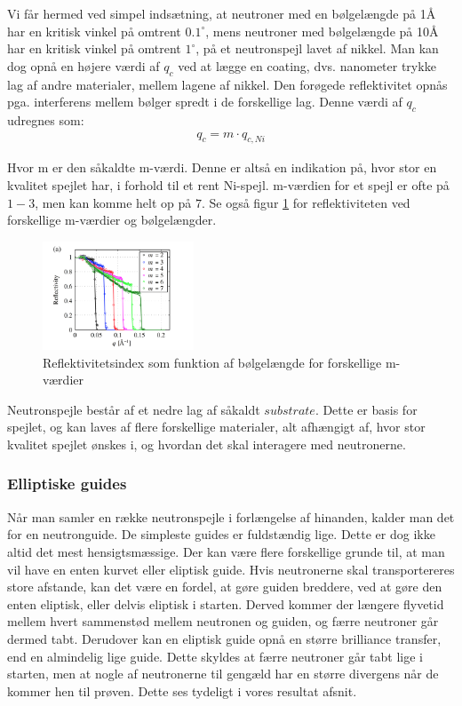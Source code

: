 \documentclass[12pt,oneside,a4paper]{article}
\begin{document}
{{{{{Vi får hermed ved simpel indsætning, at neutroner med en bølgelængde på 1Å har en kritisk vinkel på omtrent $0.1^∘$, mens neutroner med bølgelængde på 10Å har en kritisk vinkel på omtrent $1^∘$, på et neutronspejl lavet af nikkel.
Man kan dog opnå en højere værdi af $q_c$ ved at lægge en coating, dvs. nanometer trykke lag af andre materialer, mellem lagene af nikkel. Den forøgede reflektivitet opnås pga. interferens mellem bølger spredt i de forskellige lag. Denne værdi af $q_c$ udregnes som:
\begin{align}
q_c=m \cdot q_{c,Ni}
\end{align}

Hvor m er den såkaldte m-værdi. Denne er altså en indikation på, hvor stor en kvalitet spejlet har, i forhold til et rent Ni-spejl. m-værdien for et spejl er ofte på $1-3$, men kan komme helt op på $7$. \cite{lefmann_arleth_kirkensgaard_lebech_thomsen} Se også figur \ref{fig:m_values_lambda} for reflektiviteten ved forskellige m-værdier og bølgelængder.

\begin{figure}[H]
    \centering
    \includegraphics[width=0.4\textwidth]{m-values-lambda.png}
    \caption{Reflektivitetsindex som funktion af bølgelængde for forskellige m-værdier} \label{fig:m_values_lambda}
\end{figure}

Neutronspejle består af et nedre lag af såkaldt $substrate$. Dette er basis for spejlet, og kan laves af flere forskellige materialer, alt afhængigt af, hvor stor kvalitet spejlet ønskes i, og hvordan det skal interagere med neutronerne.

\subsubsection{Elliptiske guides}
Når man samler en række neutronspejle i forlængelse af hinanden, kalder man det for en neutronguide. De simpleste guides er fuldstændig lige. Dette er dog ikke altid det mest hensigtsmæssige. Der kan være flere forskellige grunde til, at man vil have en enten kurvet eller eliptisk guide. 
Hvis neutronerne skal transportereres store afstande, kan det være en fordel, at gøre guiden breddere, ved at gøre den enten eliptisk, eller delvis eliptisk i starten. Derved kommer der længere flyvetid mellem hvert sammenstød mellem neutronen og guiden, og færre neutroner går dermed tabt. 
Derudover kan en eliptisk guide opnå en større brilliance transfer, end en almindelig lige guide. Dette skyldes at færre neutroner går tabt lige  i starten, men at nogle af neutronerne til gengæld har en større divergens når de kommer hen til prøven. Dette ses tydeligt i vores resultat afsnit.

}}}}}
\end{document}
